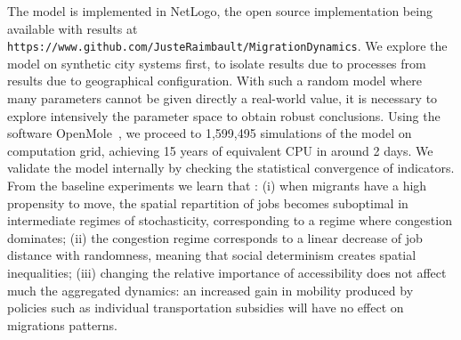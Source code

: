 The model is implemented in NetLogo, the open source implementation being available with results at \texttt{https://www.github.com/JusteRaimbault/MigrationDynamics}. We explore the model on synthetic city systems first, to isolate results due to processes from results due to geographical configuration. With such a random model where many parameters cannot be given directly a real-world value, it is necessary to explore intensively the parameter space to obtain robust conclusions. Using the software OpenMole~\cite{reuillon2013openmole}, we proceed to 1,599,495 simulations of the model on computation grid, achieving 15 years of equivalent CPU in around 2 days. We validate the model internally by checking the statistical convergence of indicators. From the baseline experiments we learn that : (i) when migrants have a high propensity to move, the spatial repartition of jobs becomes suboptimal in intermediate regimes of stochasticity, corresponding to a regime where congestion dominates; %
 (ii) the congestion regime corresponds to a linear decrease of job distance with randomness, meaning that social determinism creates spatial inequalities; %
 (iii) changing the relative importance of accessibility does not affect much the aggregated dynamics: an increased gain in mobility produced by policies such as individual transportation subsidies will have no effect on migrations patterns. %
